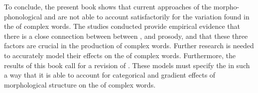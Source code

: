 To conclude, the present book shows that current approaches of the morpho-phonological and  are not able to account satisfactorily for the variation found in the  of complex words. 
 The studies conducted provide empirical evidence that there is a close connection between between ,  and prosody, and that these three factors are crucial in the production of complex words. 
Further research is needed to accurately model their effects on the  of complex words.
Furthermore, the results of this book call for a revision of . These models must specify the  in such a way that it is able to account for categorical and gradient effects of morphological structure on the  of complex words.
